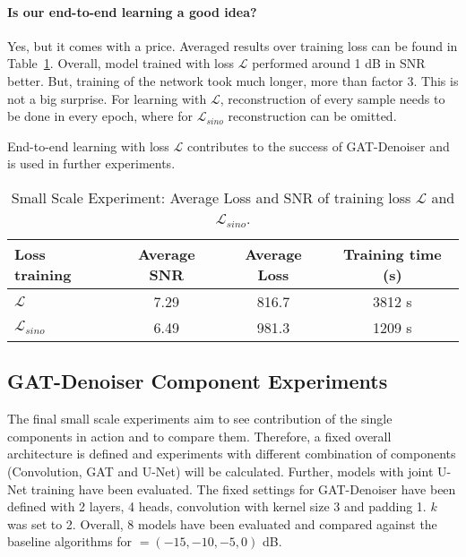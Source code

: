 \paragraph{Is our end-to-end learning a good idea?}
Yes, but it comes with a price. 
Averaged results over training loss can be found in Table~\ref{tab:loss_sino_reco}. 
Overall, model trained with loss $\mathcal{L} $ performed around 1 dB in SNR better.
But, training of the network took much longer, more than factor 3. 
This is not a big surprise. For learning with $\mathcal{L} $, reconstruction of every sample
needs to be done in every epoch, where for $\mathcal{L}_{sino}$ reconstruction can be omitted.

\begin{tcolorbox}[colback=red!5!white,colframe=red!75!black]
  End-to-end learning with loss $\mathcal{L} $ contributes to the success of GAT-Denoiser and 
   is used in further experiments.
\end{tcolorbox}


\begin{table}[H]
  \centering
    \begin{tabular}{l|ccc}
    \toprule
    \textbf{Loss training} & \textbf{Average SNR} & \textbf{Average Loss} & \textbf{Training time (s)}  \\ 
    \midrule
    $\mathcal{L} $         &  7.29    &  816.7  & 3812 s \\ \hline
    $\mathcal{L}_{sino}$   &  6.49    &  981.3  & 1209 s \\ \hline
    \midrule
    \end{tabular}
  \caption{Small Scale Experiment: Average Loss and SNR of training loss $\mathcal{L}$ and $\mathcal{L}_{sino}$.}
  \label{tab:loss_sino_reco}
\end{table}


\subsection{GAT-Denoiser Component Experiments}

The final small scale experiments aim to see contribution of the single components in action and 
to compare them.
Therefore, a fixed overall architecture is defined and experiments
with different combination of components (Convolution, GAT and U-Net) will be calculated.
Further, models with joint U-Net training have been evaluated.
The fixed settings for GAT-Denoiser have been defined with 2 layers, 4 heads, convolution with 
kernel size 3 and padding 1. $k$ was set to 2.
Overall, 8 models have been evaluated and compared against the baseline algorithms for  \snry $ = (-15,-10,-5,0) $ dB.

